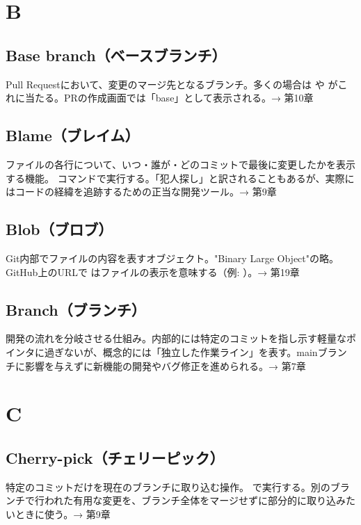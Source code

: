 \section*{B}

\subsection*{Base branch（ベースブランチ）}
Pull Requestにおいて、変更のマージ先となるブランチ。多くの場合は  や  がこれに当たる。PRの作成画面では「base」として表示される。→ 第10章

\subsection*{Blame（ブレイム）}
ファイルの各行について、いつ・誰が・どのコミットで最後に変更したかを表示する機能。 コマンドで実行する。「犯人探し」と訳されることもあるが、実際にはコードの経緯を追跡するための正当な開発ツール。→ 第9章

\subsection*{Blob（ブロブ）}
Git内部でファイルの内容を表すオブジェクト。"Binary Large Object"の略。GitHub上のURLで  はファイルの表示を意味する（例: ）。→ 第19章

\subsection*{Branch（ブランチ）}
開発の流れを分岐させる仕組み。内部的には特定のコミットを指し示す軽量なポインタに過ぎないが、概念的には「独立した作業ライン」を表す。mainブランチに影響を与えずに新機能の開発やバグ修正を進められる。→ 第7章

\section*{C}

\subsection*{Cherry-pick（チェリーピック）}
特定のコミットだけを現在のブランチに取り込む操作。 で実行する。別のブランチで行われた有用な変更を、ブランチ全体をマージせずに部分的に取り込みたいときに使う。→ 第9章

